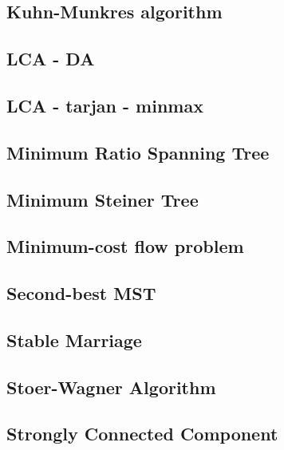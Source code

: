 \documentclass[a4paper,5pt,twocolumn,titlepage]{article}
\begin{document}
\subsection{Kuhn-Munkres algorithm}

\subsection{LCA - DA}

\subsection{LCA - tarjan - minmax}

\subsection{Minimum Ratio Spanning Tree}

\subsection{Minimum Steiner Tree}

\subsection{Minimum-cost flow problem}

\subsection{Second-best MST}


\subsection{Stable Marriage}

\subsection{Stoer-Wagner Algorithm}

\subsection{Strongly Connected Component}

\end{document}
